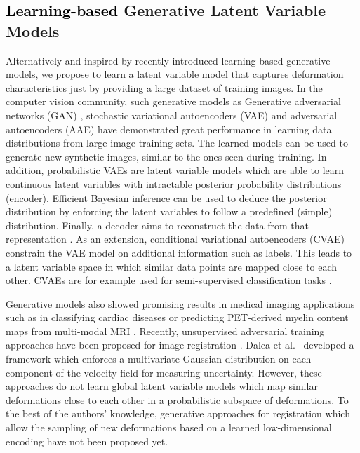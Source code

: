 \documentclass[journal]{IEEEtran}
\newcommand{\update}[1]{\textcolor{black}{#1}}
\begin{document}
\subsection{\update{Learning-based} Generative Latent Variable Models}
Alternatively and inspired by recently introduced learning-based generative models, we propose to learn a latent variable model that captures deformation characteristics just by providing a large dataset of training images. In the computer vision community, such generative models as Generative adversarial networks (GAN) \cite{goodfellow2014generative}, stochastic variational autoencoders (VAE) \cite{kingma2013auto} and adversarial autoencoders (AAE) \cite{makhzani2015adversarial} have demonstrated great performance in learning data distributions from large image training sets. The learned models can be used to generate new synthetic images, similar to the ones seen during training. In addition, probabilistic VAEs are latent variable models which are able to learn continuous latent variables with intractable posterior probability distributions (encoder). Efficient Bayesian inference can be used to deduce the posterior distribution by enforcing the latent variables to follow a predefined (simple) distribution. Finally, a decoder aims to reconstruct the data from that representation  \cite{kingma2013auto}. As an extension, conditional variational autoencoders (CVAE)  constrain the VAE model on additional information such as labels. This leads to a latent variable space in which similar data points are mapped close to each other. CVAEs are for example used for semi-supervised classification tasks \cite{kingma2014semi}. 

Generative models also showed promising results in medical imaging applications such as in classifying cardiac diseases \cite{biffi2018learning} or predicting PET-derived myelin content maps from multi-modal MRI \cite{wei2018learning}. Recently, unsupervised adversarial training approaches have been proposed for image registration \cite{mahapatra2018deformable,fan2018adversarial,tanner2018generative}. Dalca et al.\ \cite{dalca2018unsupervised} developed a framework which enforces a multivariate Gaussian distribution on each component of the velocity field for measuring uncertainty. However, these approaches do not learn global latent variable models which map similar deformations close to each other in a probabilistic subspace of deformations. To the best of the authors' knowledge, generative approaches for registration which allow the sampling of new deformations based on a learned low-dimensional encoding have not been proposed yet. 
\end{document}
